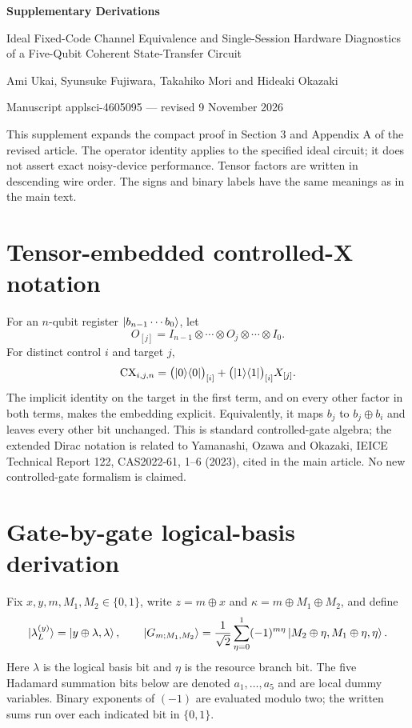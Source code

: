\documentclass[10pt,a4paper]{article}
\begin{document}
\begin{center}
{\LARGE\bfseries Supplementary Derivations}\par\vspace{6pt}
{\normalsize Ideal Fixed-Code Channel Equivalence and Single-Session Hardware Diagnostics of a Five-Qubit Coherent State-Transfer Circuit}\par\vspace{4pt}
Ami Ukai, Syunsuke Fujiwara, Takahiko Mori and Hideaki Okazaki\par
Manuscript applsci-4605095 --- revised 9 November 2026
\end{center}

This supplement expands the compact proof in Section 3 and Appendix A of the revised article. The operator identity applies to the specified ideal circuit; it does not assert exact noisy-device performance. Tensor factors are written in descending wire order. The signs and binary labels have the same meanings as in the main text.

\section{Tensor-embedded controlled-X notation}
For an $n$-qubit register $\ket{b_{n-1}\cdots b_0}$, let
\[
 O_{[j]}=I_{n-1}\otimes\cdots\otimes O_j\otimes\cdots\otimes I_0.
\]
For distinct control $i$ and target $j$,
\begin{equation}
\mathrm{CX}_{i,j,n}=\bigl(\ket0\!\bra0\bigr)_{[i]}+
\bigl(\ket1\!\bra1\bigr)_{[i]}X_{[j]}.
\end{equation}
The implicit identity on the target in the first term, and on every other factor in both terms, makes the embedding explicit. Equivalently, it maps $b_j$ to $b_j\oplus b_i$ and leaves every other bit unchanged. This is standard controlled-gate algebra; the extended Dirac notation is related to Yamanashi, Ozawa and Okazaki, IEICE Technical Report 122, CAS2022-61, 1--6 (2023), cited in the main article. No new controlled-gate formalism is claimed.

\section{Gate-by-gate logical-basis derivation}
Fix $x,y,m,M_1,M_2\in\{0,1\}$, write $z=m\oplus x$ and $\kappa=m\oplus M_1\oplus M_2$, and define
\begin{equation}
\ket{\lambda_L^{(y)}}=\ket{y\oplus\lambda,\lambda},\qquad
\ket{G_{m;M_1,M_2}}=\frac1{\sqrt2}\sum_{\eta=0}^1(-1)^{m\eta}
\ket{M_2\oplus\eta,M_1\oplus\eta,\eta}.
\end{equation}
Here $\lambda$ is the logical basis bit and $\eta$ is the resource branch bit. The five Hadamard summation bits below are denoted $a_1,\ldots,a_5$ and are local dummy variables. Binary exponents of $(-1)$ are evaluated modulo two; the written sums run over each indicated bit in $\{0,1\}$.
\end{document}
